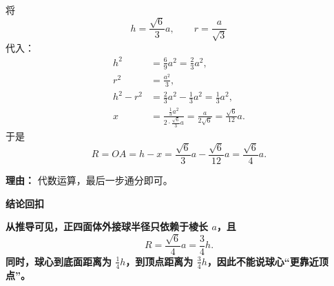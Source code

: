 \begin{proofbox}
\begin{description}[style=nextline, leftmargin=2.8em, labelsep=0.5em, itemsep=0.55em]
		\item[\textbf{步骤六（代值求半径）：}] 将
		      \[
			      h=\frac{\sqrt{6}}{3}a,\qquad r=\frac{a}{\sqrt{3}}
		      \]
		      代入：
		      \[
			      \begin{aligned}
				      h^2     & = \frac{6}{9}a^2=\frac{2}{3}a^2,                    \\
				      r^2     & = \frac{a^2}{3},                                    \\
				      h^2-r^2 & = \frac{2}{3}a^2-\frac{1}{3}a^2=\frac{1}{3}a^2,     \\
				      x       & = \frac{\frac{1}{3}a^2}{2\cdot \frac{\sqrt{6}}{3}a}
				      = \frac{a}{2\sqrt{6}}
				      = \frac{\sqrt{6}}{12}a.
			      \end{aligned}
		      \]
		      于是
		      \[
			      R=OA=h-x
			      =\frac{\sqrt{6}}{3}a-\frac{\sqrt{6}}{12}a
			      =\frac{\sqrt{6}}{4}a.
		      \]
		      \par\textbf{理由：} 代数运算，最后一步通分即可。

	\end{description}

	\medskip
	\textbf{\textcolor{CProof}{结论回扣}}

	\textbf{从推导可见，正四面体外接球半径只依赖于棱长 $a$，且}
	\[
		\boxed{R=\frac{\sqrt{6}}{4}a=\frac{3}{4}h.}
	\]
	\textbf{同时，球心到底面距离为 $\frac{1}{4}h$，到顶点距离为 $\frac{3}{4}h$，因此不能说球心“更靠近顶点”。}
\end{proofbox}